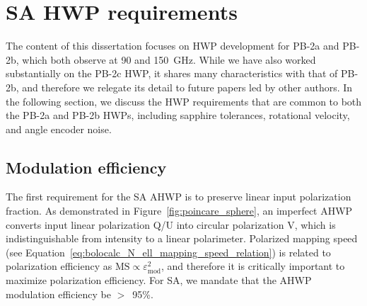 
\section{SA HWP requirements}
\label{sec:sa_hwp_requirements}

The content of this dissertation focuses on HWP development for PB-2a and PB-2b, which both observe at 90 and 150~GHz. While we have also worked substantially on the PB-2c HWP, it shares many characteristics with that of PB-2b, and therefore we relegate its detail to future papers led by other authors. In the following section, we discuss the HWP requirements that are common to both the PB-2a and PB-2b HWPs, including sapphire tolerances, rotational velocity, and angle encoder noise.


\subsection{Modulation efficiency}
\label{sec:sa_hwp_requirements_modulation_efficiency}

The first requirement for the SA AHWP is to preserve linear input polarization fraction. As demonstrated in Figure~\ref{fig:poincare_sphere}, an imperfect AHWP converts input linear polarization Q/U into circular polarization V, which is indistinguishable from intensity to a linear polarimeter. Polarized mapping speed (see Equation~\ref{eq:bolocalc_N_ell_mapping_speed_relation}) is related to polarization efficiency as $\mathrm{MS} \propto \varepsilon_{\mathrm{mod}}^{2}$, and therefore it is critically important to maximize polarization efficiency. For SA, we mandate that the AHWP modulation efficiency be $>$~95\%.

